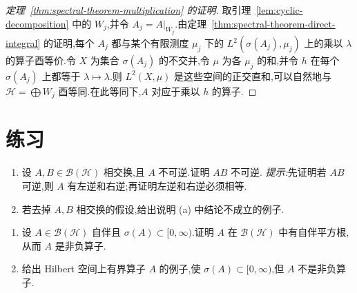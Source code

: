 \begin{proof}[定理~\ref{thm:spectral-theorem-multiplication} 的证明]
取引理~\ref{lem:cyclic-decomposition} 中的 \(W_{j}\),并令 \(A_{j}=A|_{W_{j}}\).由定理~\ref{thm:spectral-theorem-direct-integral} 的证明,每个 \(A_{j}\) 都与某个有限测度 \(\mu_{j}\) 下的 \(L^{2}(\sigma(A_{j}),\mu_{j})\) 上的乘以 \(\lambda\) 的算子酉等价.令 \(X\) 为集合 \(\sigma(A_{j})\) 的不交并,令 \(\mu\) 为各 \(\mu_{j}\) 的和,并令 \(h\) 在每个 \(\sigma(A_{j})\) 上都等于 \(\lambda\mapsto\lambda\).则 \(L^{2}(X,\mu)\) 是这些空间的正交直和,可以自然地与 \(\mathcal{H}=\bigoplus W_{j}\) 酉等同.在此等同下,\(A\) 对应于乘以 \(h\) 的算子.
\end{proof}

\section{练习}
\label{sec:chapter8-exercises}

\begin{exercise}[不可逆算子的乘积]\label{ex:noninvertible-product}
\begin{enumerate}[label=(\alph*)]
\item 设 \(A,B\in\mathcal{B}(\mathcal{H})\) 相交换,且 \(A\) 不可逆.证明 \(AB\) 不可逆.
\emph{提示:}先证明若 \(AB\) 可逆,则 \(A\) 有左逆和右逆;再证明左逆和右逆必须相等.
\item 若去掉 \(A,B\) 相交换的假设,给出说明 (a) 中结论不成立的例子.
\end{enumerate}
\end{exercise}

\begin{exercise}[非负自伴算子的平方根]\label{ex:selfadjoint-square-root}
\begin{enumerate}[label=(\alph*)]
\item 设 \(A\in\mathcal{B}(\mathcal{H})\) 自伴且 \(\sigma(A)\subset[0,\infty)\).证明 \(A\) 在 \(\mathcal{B}(\mathcal{H})\) 中有自伴平方根,从而 \(A\) 是非负算子.
\item 给出 Hilbert 空间上有界算子 \(A\) 的例子,使 \(\sigma(A)\subset[0,\infty)\),但 \(A\) 不是非负算子.
\end{enumerate}
\end{exercise}

